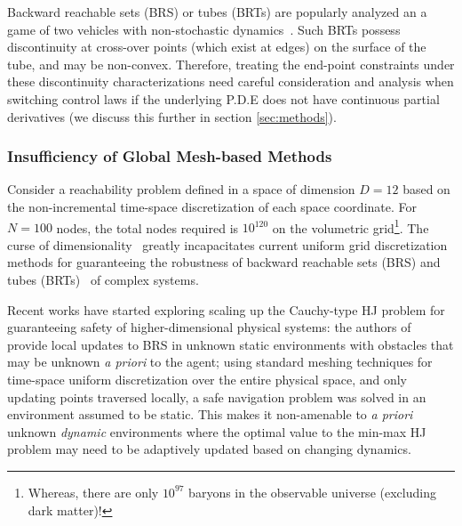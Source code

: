 Backward reachable sets (BRS) or tubes (BRTs) are popularly analyzed an a game of two vehicles with non-stochastic dynamics~\cite{Merz1972}. Such BRTs possess discontinuity at cross-over points (which exist at edges) on the surface of the  tube, and may be non-convex. Therefore, treating the end-point constraints under these discontinuity characterizations need careful consideration and analysis when switching control laws if the underlying P.D.E does not have continuous partial  derivatives (we discuss this further in section \ref{sec:methods}). 
 

\subsubsection{Insufficiency of Global Mesh-based Methods}

\noindent  %
%
Consider a reachability problem defined in a space of dimension $D=12$ based on the non-incremental time-space discretization of each space coordinate. For $N=100$ nodes, the total nodes required is $10^{120}$ on the volumetric grid\footnote{Whereas, there are only $10^{97}$ baryons in the observable universe (excluding dark matter)!}. The curse of dimensionality~\cite{Bellman1957} greatly incapacitates current uniform grid discretization methods for guaranteeing the robustness of backward reachable sets (BRS) and tubes (BRTs)~\cite{Mitchell2005} of complex systems. 


Recent works have started exploring scaling up the Cauchy-type HJ problem for guaranteeing safety of higher-dimensional physical systems: the authors of~\cite{Bajcsy} provide local updates to BRS in  unknown static environments with obstacles that may be unknown \textit{a priori} to the agent; using standard meshing techniques for time-space uniform discretization over the entire physical space, and only updating points traversed locally, a safe navigation problem was solved in an   environment assumed to be static. This makes it non-amenable to \textit{a priori} unknown \textit{dynamic} environments where the optimal value to the min-max HJ problem may need to be adaptively updated based on changing dynamics. 

